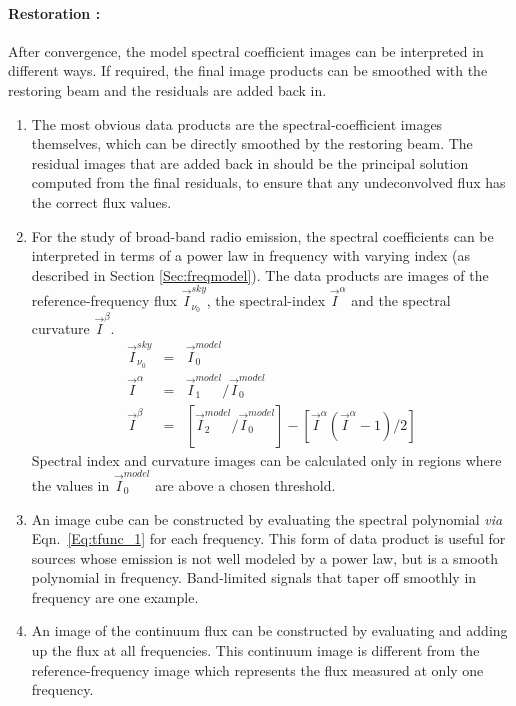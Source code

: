 \documentclass[structabstract]{stylefiles/aa}
\begin{document}
\noindent\paragraph{\bf Restoration :}
After convergence, the model spectral coefficient images can be interpreted in
different ways. If required, the final image products can be smoothed
with the restoring beam and the residuals are added back in. 
\begin{enumerate}
\item The most obvious data products are the spectral-coefficient images themselves, 
which can be directly smoothed by the restoring beam. The residual images that are added
back in should be the principal solution computed from the final residuals, to
ensure that any undeconvolved flux has the correct flux values.
\item  For the study of broad-band radio emission, the spectral coefficients can be
interpreted in terms of a power law in frequency with varying index
(as described in Section \ref{Sec:freqmodel}).
The data products are images of the reference-frequency flux $\vec{I}^{sky}_{\nu_0}$,
the spectral-index $\vec{I}^{\alpha}$ and the spectral curvature $\vec{I}^{\beta}$.
\begin{eqnarray}
\label{Eq:calcab_1}
\vec{I}^{sky}_{\nu_0} &=& \vec{I}^{model}_0 \\
\label{Eq:calcab_2}
\vec{I}^{\alpha} &=& {\vec{I}^{model}_1}/{\vec{I}^{model}_0}  \\
\label{Eq:calcab_3}
\vec{I}^{\beta} &=& \left[{\vec{I}^{model}_2}/{\vec{I}^{model}_0}\right] - \left[{{\vec{I}^{\alpha}(\vec{I}^{\alpha}-1)}}{/2}\right]
\end{eqnarray}
Spectral index and curvature images can be calculated only in regions where
the values in $\vec{I}^{model}_0$ are above a chosen threshold.
\item An image cube can be constructed by evaluating the spectral polynomial
{\it via} Eqn.~\ref{Eq:tfunc_1} for each frequency. This form of data product is
useful for sources whose emission is not well modeled by a power law,
but is a smooth polynomial in frequency. Band-limited signals that taper off
smoothly in frequency are one example.
\item An image of the continuum flux can be constructed by evaluating and adding up
the flux at all frequencies. This continuum image is different from the 
reference-frequency image which represents the flux measured at only one frequency.
\end{enumerate}
\end{document}
